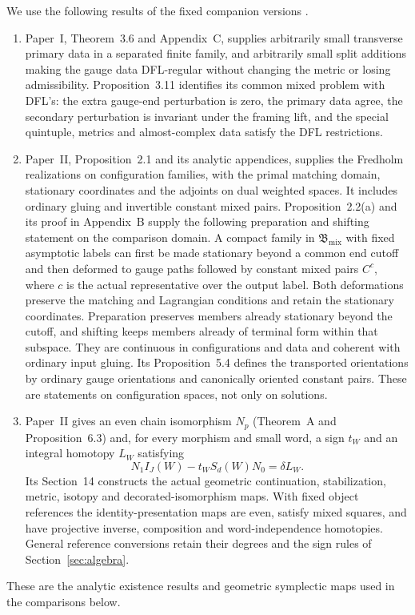 \documentclass[11pt]{amsart}
\theoremstyle{definition}
\theoremstyle{remark}
\theoremstyle{plain}
\newcommand{\IGJ}{I_J}
\begin{document}
We use the following results of the fixed companion versions
\cite{PaperI,PaperII}.
\begin{enumerate}[label=(\roman*),leftmargin=*]
\item Paper~I, Theorem~3.6 and Appendix~C, supplies arbitrarily
small transverse primary data in a separated finite family, and
arbitrarily small split additions making the gauge data DFL-regular
without changing the metric or losing admissibility. Proposition~3.11
identifies its common mixed problem with DFL's: the extra gauge-end
perturbation is zero, the primary data agree, the secondary
perturbation is invariant under the framing lift, and the special
quintuple, metrics and almost-complex data satisfy the DFL restrictions.
\item Paper~II, Proposition~2.1 and its analytic appendices, supplies
the Fredholm realizations on configuration families, with the primal
matching domain, stationary coordinates and the adjoints on dual
weighted spaces. It includes ordinary gluing and invertible constant mixed pairs.
Proposition~2.2(a) and its proof in Appendix~B supply the following
preparation and shifting statement on the comparison domain. A
compact family in $\mathfrak B_{\mathrm{mix}}$ with fixed asymptotic
labels can first be made stationary beyond a common end cutoff and
then deformed to gauge paths followed by constant mixed pairs $C^c$,
where $c$ is the actual representative over the output label. Both
deformations preserve the matching and Lagrangian conditions and
retain the stationary coordinates. Preparation preserves members
already stationary beyond the cutoff, and shifting keeps members
already of terminal form within that subspace. They are continuous in
configurations and data and coherent with ordinary input gluing.
Its Proposition~5.4 defines the transported orientations
by ordinary gauge orientations and canonically oriented constant
pairs. These are statements on configuration spaces, not only on
solutions.
\item Paper~II gives an even chain isomorphism $N_p$
(Theorem~A and Proposition~6.3)
and, for every morphism and small word, a sign $t_W$ and an integral
homotopy $L_W$ satisfying
\begin{equation}\label{eq:II-square}
 N_1\IGJ(W)-t_WS_d(W)N_0=\delta L_W.
\end{equation}
Its Section~14 constructs the actual geometric continuation,
stabilization, metric, isotopy and decorated-isomorphism maps.
With fixed object references the identity-presentation maps are even,
satisfy mixed squares, and have projective inverse, composition and
word-independence homotopies. General reference conversions retain
their degrees and the sign rules of Section~\ref{sec:algebra}.
\end{enumerate}
These are the analytic existence results and geometric symplectic
maps used in the comparisons below.
\end{document}
